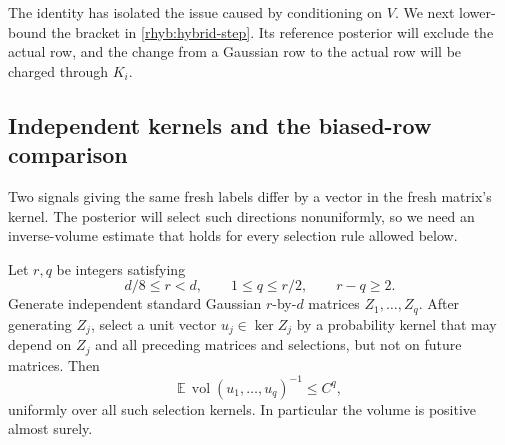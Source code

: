 The identity has isolated the issue caused by conditioning on \(V\).
We next lower-bound the bracket in \eqref{rhyb:hybrid-step}.  Its reference
posterior will exclude the actual row, and the change from a Gaussian
row to the actual row will be charged through \(K_i\).

\subsection{Independent kernels and the biased-row comparison}

Two signals giving the same fresh labels differ by a vector in the
fresh matrix's kernel.  The posterior will select such directions
nonuniformly, so we need an inverse-volume estimate that holds for every
selection rule allowed below.

\begin{lemma}
\label{rhyb:inverse-volume}
Let \(r,q\) be integers satisfying
\[
 d/8\le r<d,\qquad 1\le q\le r/2,\qquad r-q\ge2.
\]
Generate independent standard Gaussian \(r\)-by-\(d\) matrices
\(Z_1,\ldots,Z_q\).  After generating \(Z_j\), select a unit vector
\(u_j\in\ker Z_j\) by a probability kernel that may depend on \(Z_j\)
and all preceding matrices and selections, but not on future matrices.
Then
\begin{equation}\label{rhyb:volume-moment}
 \mathbb E\,\operatorname{vol}(u_1,\ldots,u_q)^{-1}\le C^q,
\end{equation}
uniformly over all such selection kernels.  In particular the volume
is positive almost surely.
\end{lemma}

